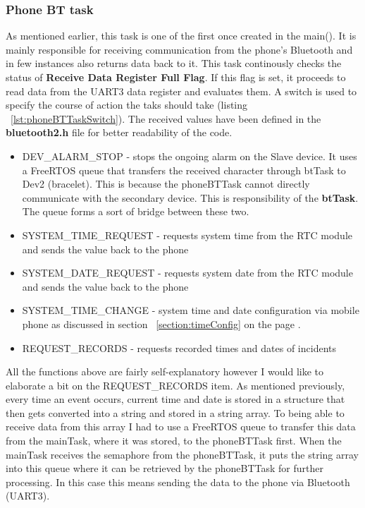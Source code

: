 \documentclass[12pt,a4paper]{article}
\begin{document}
        \subsubsection*{Phone BT task}
        As mentioned earlier, this task is one of the first once created in the main(). It is mainly responsible for receiving communication from the phone's Bluetooth and in few instances also returns data back to it. This task continously checks the status of {\bfseries Receive Data Register Full Flag}. If this flag is set, it proceeds to read data from the UART3 data register and evaluates them. A switch is used to specify the course of action the taks should take (listing ~\ref{lst:phoneBTTaskSwitch}). The received values have been defined in the {\bfseries bluetooth2.h} file for better readability of the code.\\
        
		\begin{itemize}[topsep=4pt,itemsep=1pt]
            \item DEV\_ALARM\_STOP - stops the ongoing alarm on the Slave device. It uses a FreeRTOS queue that transfers the received character through btTask to Dev2 (bracelet). This is because the phoneBTTask cannot directly communicate with the secondary device. This is responsibility of the {\bfseries btTask}. The queue forms a sort of bridge between these two.
            \item SYSTEM\_TIME\_REQUEST - requests system time from the RTC module and sends the value back to the phone  
            \item SYSTEM\_DATE\_REQUEST - requests system date from the RTC module and sends the value back to the phone 
            \item SYSTEM\_TIME\_CHANGE - system time and date configuration via mobile phone as discussed in section ~\ref{section:timeConfig} on the page \pageref{section:timeConfig}.   
            \item REQUEST\_RECORDS - requests recorded times and dates of incidents  
		\end{itemize}
		
		All the functions above are fairly self-explanatory however I would like to elaborate a bit on the REQUEST\_RECORDS item. As mentioned previously, every time an event occurs, current time and date is stored in a structure that then gets converted into a string and stored in a string array. To being able to receive data from this array I had to use a FreeRTOS queue to transfer this data from the mainTask, where it was stored, to the phoneBTTask first. When the mainTask receives the semaphore from the phoneBTTask, it puts the string array into this queue where it can be retrieved by the phoneBTTask for further processing. In this case this means sending the data to the phone via Bluetooth (UART3).
        
\end{document}

